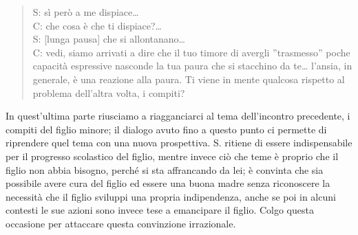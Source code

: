 \begin{verse}
S: sì però a me dispiace\ldots{}  \\
C: che cosa è che ti dispiace?\ldots{}  \\
S: [lunga pausa] che si allontanano\ldots{}  \\
C: vedi, siamo arrivati a dire che il tuo timore di avergli ''trasmesso'' poche capacità espressive nasconde la tua paura che si stacchino da te\ldots{}   l'ansia, in generale, è una reazione alla paura. Ti viene in mente qualcosa rispetto al problema dell'altra volta, i compiti?
\end{verse}

\noindent In quest'ultima parte riusciamo a riagganciarci al tema dell'incontro precedente, i compiti del figlio minore; il dialogo avuto fino a questo punto ci permette di riprendere quel tema con una nuova prospettiva. S. ritiene di essere indispensabile per il progresso scolastico del figlio, mentre invece ciò che teme è proprio che il figlio non abbia bisogno, perché si sta affrancando da lei; è convinta che sia possibile avere cura del figlio ed essere una buona madre senza riconoscere la necessità che il figlio sviluppi una propria indipendenza, anche se poi in alcuni contesti le sue azioni sono invece tese a emancipare il figlio. Colgo questa occasione per attaccare questa convinzione irrazionale.

